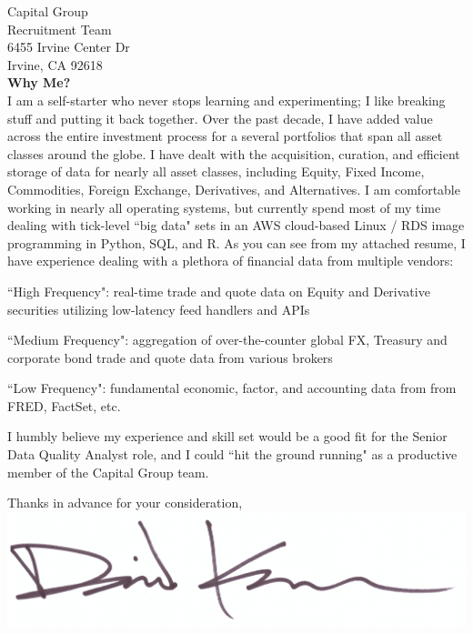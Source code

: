 \documentclass{letter}
\begin{document}
\begin{letter}{
  Capital Group \\
  Recruitment Team \\ 
  6455 Irvine Center Dr \\
  Irvine, CA 92618 \\
}
\textbf{Why Me?} \\
I am a self-starter who never stops learning and experimenting;
I like breaking stuff and putting it back together. Over the past
decade, I have added value across the entire investment process for a several
portfolios that span all asset classes around the globe. I have dealt with the
acquisition, curation, and efficient storage of data for nearly all asset classes,
including Equity, Fixed Income, Commodities, Foreign Exchange, Derivatives, and
Alternatives. I am comfortable working in nearly all operating systems, but currently
spend most of my time dealing with tick-level ``big data" sets in an AWS cloud-based
Linux / RDS image programming in Python, SQL, and R. As you can see from my attached resume,
I have experience dealing with a plethora of financial data from multiple vendors: \\

\newpage

\begin{list}{}{\leftmargin=1em}
  \item ``High Frequency": real-time trade and quote data on Equity and Derivative
  securities utilizing low-latency feed handlers and APIs
  \item ``Medium Frequency": aggregation of over-the-counter global FX, Treasury and
  corporate bond trade and quote data from various brokers
  \item ``Low Frequency": fundamental economic, factor, and accounting data from
  from FRED, FactSet, etc.
\end{list}

I humbly believe my experience and skill set would be a good fit for the Senior
Data Quality Analyst role, and I could ``hit the ground running"
as a productive member of the Capital Group team.

\closing{
  Thanks in advance for your consideration, \\
  \vspace{.33in}
  \includegraphics[scale=0.33]{signature.png}
}

\end{letter}
\end{document}
